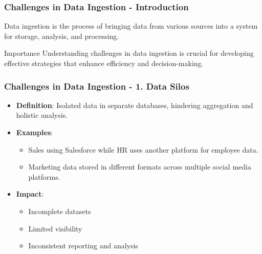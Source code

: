 \documentclass{beamer}
\begin{document}
\begin{frame}[fragile]
    \frametitle{Challenges in Data Ingestion - Introduction}
    Data ingestion is the process of bringing data from various sources into a system for storage, analysis, and processing. 
    \begin{block}{Importance}
        Understanding challenges in data ingestion is crucial for developing effective strategies that enhance efficiency and decision-making.
    \end{block}
\end{frame}

\begin{frame}[fragile]
    \frametitle{Challenges in Data Ingestion - 1. Data Silos}
    \begin{itemize}
        \item \textbf{Definition}: Isolated data in separate databases, hindering aggregation and holistic analysis.
        \item \textbf{Examples}:
            \begin{itemize}
                \item Sales using Salesforce while HR uses another platform for employee data.
                \item Marketing data stored in different formats across multiple social media platforms.
            \end{itemize}
        \item \textbf{Impact}: 
            \begin{itemize}
                \item Incomplete datasets
                \item Limited visibility
                \item Inconsistent reporting and analysis
            \end{itemize}
    \end{itemize}
\end{frame}
\end{document}
